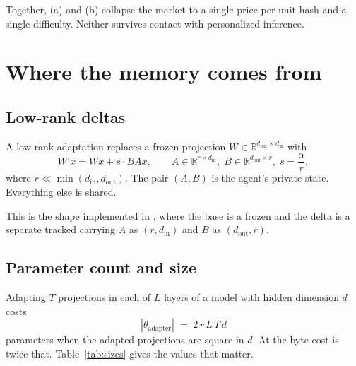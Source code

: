 \documentclass[11pt,a4paper]{article}
\begin{document}
Together, (a) and (b) collapse the market to a single price per unit hash and a
single difficulty. Neither survives contact with personalized inference.

\section{Where the memory comes from}

\subsection{Low-rank deltas}

A low-rank adaptation replaces a frozen projection $W \in \mathbb{R}^{d_{\mathrm{out}} \times d_{\mathrm{in}}}$
with
\begin{equation}
W' x = W x + s \cdot B A x,
\qquad
A \in \mathbb{R}^{r \times d_{\mathrm{in}}},\;
B \in \mathbb{R}^{d_{\mathrm{out}} \times r},\;
s = \frac{\alpha}{r},
\end{equation}
where $r \ll \min(d_{\mathrm{in}}, d_{\mathrm{out}})$. The pair $(A,B)$ is the
agent's private state. Everything else is shared.

This is the shape implemented in , where the base
is a frozen  and the delta is a separate tracked
 carrying $A$ as $(r, d_{\mathrm{in}})$
and $B$ as $(d_{\mathrm{out}}, r)$.

\subsection{Parameter count and size}

Adapting $T$ projections in each of $L$ layers of a model with hidden dimension
$d$ costs
\begin{equation}
|\theta_{\text{adapter}}| \;=\; 2\,r\,L\,T\,d
\end{equation}
parameters when the adapted projections are square in $d$. At  the
byte cost is twice that. Table~\ref{tab:sizes} gives the values that matter.
\end{document}
